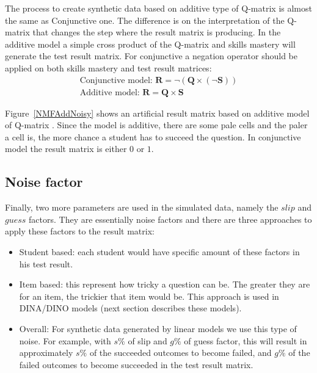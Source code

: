 The process to create synthetic data based on additive type of Q-matrix is almost the same as Conjunctive one. The difference is on the interpretation of the Q-matrix that changes the step where the result matrix is producing. In the additive model a simple cross product of the Q-matrix and skills mastery will generate the test result matrix. For conjunctive a negation operator should be applied on both skills mastery and test result matrices: 
\begin{equation}
\begin{array}{c}
\text{Conjunctive model:   } \mathbf{R}=\neg\left(\mathbf{Q}\times\left(\neg\mathbf{S}\right)\right)\\
\text{Additive model:   } \mathbf{R}=\mathbf{Q}\times\mathbf{S}
\end{array}
\label{NMF_GEN_EQ}
\end{equation}

Figure~\ref{NMFAddNoisy} shows an artificial result matrix based on additive model of Q-matrix . Since the model is additive, there are some pale cells and the paler a cell is, the more chance a student has to succeed the question. In conjunctive model the result matrix is either $0$ or $1$. 



\subsection{Noise factor}
\label{Noise_}
Finally, two more parameters are used in the simulated data, namely the $\mathit{slip}$ and $\mathit{guess}$ factors. They are essentially noise factors and there are three approaches to apply these factors to the result matrix:
\begin{itemize}
\item Student based: each student would have specific amount of these factors in his test result.
\item Item based: this represent how tricky a question can be. The greater they are for an item, the trickier that item would be. This approach is used in DINA/DINO models (next section describes these models).
\item Overall: For synthetic data generated by linear models we use this type of noise. For example, with $s\%$ of slip and $g\%$ of guess factor, this will result in approximately $s\%$ of the succeeded outcomes to become failed, and $g\%$ of the failed outcomes to become succeeded in the test result matrix.

\end{itemize}

